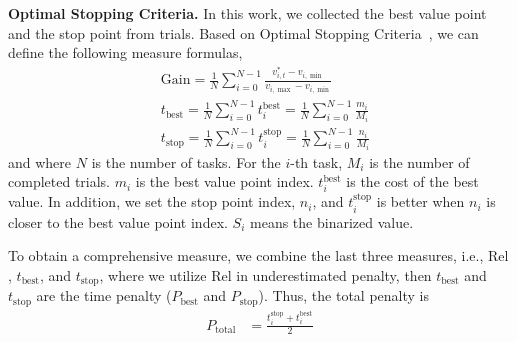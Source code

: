 \noindent\textbf{Optimal Stopping Criteria.}
In this work, we collected the best value point and the stop point from trials. Based on Optimal Stopping Criteria~\cite{hill2009knowing}, we can define the following measure formulas,
\begin{align}
    & \text{Gain} = \frac{1}{N} \sum^{N-1}_{i=0} \frac{v^*_{i,t} - v_{i,\min}}{v_{i,\max} - v_{i, \min}}
     \\
    & t_{\text{best}} = \frac{1}{N} \sum^{N-1}_{i=0}t^{\text{best}}_i = \frac{1}{N} \sum^{N-1}_{i=0} \frac{m_i}{M_i} \\
    & t_{\text{stop}} = \frac{1}{N} \sum^{N-1}_{i=0}t^{\text{stop}}_i = \frac{1}{N} \sum^{N-1}_{i=0} \frac{n_i}{M_i}
\end{align}
and
where $N$ is the number of tasks. For the $i$-th task, $M_i$ is the number of completed trials. $m_i$ is the best value point index. $t_i^{\text{best}}$ is the cost of the best value. In addition, we set the stop point index, $n_i$, and $t_i^{\text{stop}}$ is better when $n_i$ is closer to the best value point index. $S_i$ means the binarized value.

To obtain a comprehensive measure, we combine the last three measures, i.e., $\text{Rel}$, $t_{\text{best}}$, and $t_{\text{stop}}$, where we utilize  $\text{Rel}$ in underestimated penalty, then $t_{\text{best}}$ and $t_{\text{stop}}$ are the time penalty ($P_\text{best}$ and $P_\text{stop}$). Thus, the total penalty is
\begin{align}
    P_{\text{total}} &= \frac{t_i^{\text{stop}} + t_i^{\text{best}}}{2}
\end{align}

